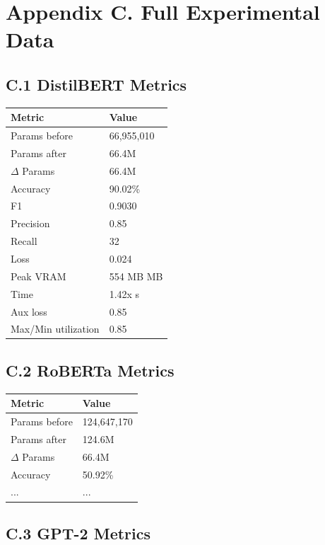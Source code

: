 \section{Appendix C. Full Experimental Data}

\subsection{C.1 DistilBERT Metrics}

\begin{table}[H]
\centering
\small
\begin{tabular}{ll}
\toprule
\textbf{Metric} & \textbf{Value} \\
\midrule
Params before & 66,955,010 \\
Params after & 66.4M \\
$\Delta$ Params & 66.4M \\
Accuracy & 90.02\% \\
F1 & 0.9030 \\
Precision & 0.85 \\
Recall & 32 \\
Loss & 0.024 \\
Peak VRAM & 554 MB MB \\
Time & 1.42x s \\
Aux loss & 0.85 \\
Max/Min utilization & 0.85 \\
\bottomrule
\end{tabular}
\end{table}

\subsection{C.2 RoBERTa Metrics}

\begin{table}[H]
\centering
\small
\begin{tabular}{ll}
\toprule
\textbf{Metric} & \textbf{Value} \\
\midrule
Params before & 124,647,170 \\
Params after & 124.6M \\
$\Delta$ Params & 66.4M \\
Accuracy & 50.92\% \\
... & ... \\
\bottomrule
\end{tabular}
\end{table}

\subsection{C.3 GPT-2 Metrics}

